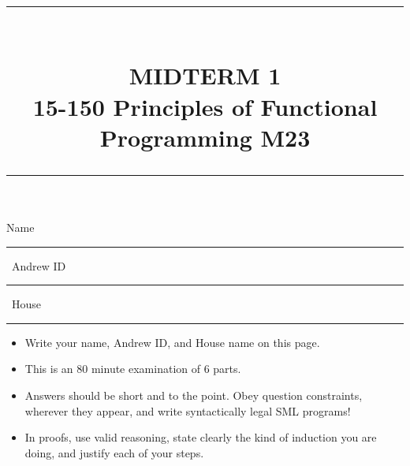 \documentclass[addpoints,12pt]{exam}
\newcommand{\HRule}[1]{\rule{\linewidth}{#1}}
\begin{document}
\pagestyle{fancy}
\fancyhead{} %
\fancyfoot[C]{\thepage} %


\setlength{\droptitle}{-8em}   %

\title{ \normalsize \textsc{}
		\HRule{1.5pt} \\
		\large \textbf{
      \uppercase{Midterm 1} \\
      15-150 Principles of Functional Programming M23} \\
    \HRule{1.5pt}
    \date{}
}

\maketitle

\vspace{-3cm}

\hspace{-1cm} Name \rule{5cm}{0.4pt} \, Andrew ID \rule{3cm}{0.4pt} \, House \rule{3.5cm}{0.4pt} 

\vspace{5pt}

\begin{itemize}
  \item Write your name, Andrew ID, and House name on this page. 
  \item This is an 80 minute examination of 6 parts.
  \item Answers should be short and to the point. Obey question constraints, wherever
  they appear, and write syntactically legal SML programs!
  \item In proofs, use valid reasoning, state clearly the kind of induction you are
  doing, and justify each of your steps.
\end{itemize}
\vspace{\fill}

{\small
\vqword{}
\begin{center}
\gradetable[v][questions]
\end{center}
}

\vspace{\fill}
\end{document}
